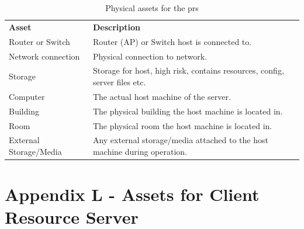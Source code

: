 \begin{appendices}
\begin{table}[htp]
  \begin{tabularx}{\linewidth}{lX}
    \textbf{Asset}          & \textbf{Description} \\
    Router or Switch        &	Router (AP) or Switch host is connected to. \\
    Network connection      &	Physical connection to network. \\
    Storage                 &	Storage for host, high risk, contains resources, config, server files etc. \\
    Computer                &	The actual host machine of the server. \\
    Building                &	The physical building the host machine is located in. \\
    Room                    &	The physical room the host machine is located in. \\
    External Storage/Media  &	Any external storage/media attached to the host machine during operation. \\
  \end{tabularx}
  \caption{Physical assets for the \acrfull{prs}}
  \label{tab:physical_assets_pr}
\end{table}

\section{Appendix L - Assets for Client Resource Server}
\label{appendix:crs_assets}


\end{appendices}
